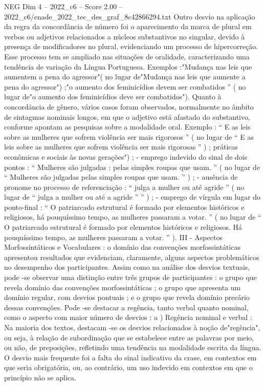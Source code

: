 \begin{textsample}{NEG Dim 4 – 2022\_c6 – Score 2.00 – 2022\_c6/enade\_2022\_tec\_des\_graf\_8c42866294.txt}
Outro desvio na aplicação da regra da concordância de número foi o aparecimento da marca de plural em verbos ou adjetivos relacionados a núcleos substantivos no singular, devido à presença de modificadores no plural, evidenciando um processo de hipercorreção.
Esse processo tem se ampliado nas situações de oralidade, caracterizando uma tendência de variação da Língua Portuguesa.
Exemplos :"Mudança nas leis que aumentem a pena do agressor"( no lugar de"Mudança nas leis que aumente a pena do agressor") ;"o aumento dos feminicídios devem ser combatidos ” ( no lugar de"o aumento dos feminicídios deve ser combatidos").
Quanto à concordância de gênero, vários casos foram observados, normalmente no âmbito de sintagmas nominais longos, em que o adjetivo está afastado do substantivo, conforme apontam as pesquisas sobre a modalidade oral.
Exemplo : “ E as leis sobre as mulheres que sofrem violência ser mais rigorosos ” ( no lugar de “ E as leis sobre as mulheres que sofrem violência ser mais rigorosas ” ) ; práticas econômicas e sociais às novas gerações") ; - emprego indevido do sinal de dois pontos : “ Mulheres são julgadas : pelas simples roupas que usam. ” ( no lugar de “ Mulheres são julgadas pelas simples roupas que usam. ” ) ; - ausência de pronome no processo de referenciação : “ julga a mulher ou até agride ” ( no lugar de “ julga a mulher ou até a agride ” ” ) ; - emprego de vírgula em lugar do ponto-final : “ O patriarcado estrutural é formado por elementos históricos e religiosos, há pouquíssimo tempo, as mulheres passaram a votar. ” ( no lugar de “ O patriarcado estrutural é formado por elementos históricos e religiosos.
Há pouquíssimo tempo, as mulheres passaram a votar. ” ).
III - Aspectos Morfossintáticos e Vocabulares : o domínio das convenções morfossintáticas apresentou resultados que evidenciam, claramente, alguns aspectos problemáticos no desempenho dos participantes.
Assim como na análise dos desvios textuais, pode -se observar uma distinção entre três grupos de participantes : o grupo que revela domínio das convenções morfossintáticas ; o grupo que apresenta um domínio regular, com desvios pontuais ; e o grupo que revela domínio precário dessas convenções.
Pode -se destacar a regência, tanto verbal quanto nominal, como o aspecto com maior número de desvios : a ) Regência nominal e verbal : Na maioria dos textos, destacam -se os desvios relacionados à noção de"regência", ou seja, à relação de subordinação que se estabelece entre as palavras por meio, ou não, de preposições, refletindo uma tendência na modalidade escrita da língua.
O desvio mais frequente foi a falta do sinal indicativo da crase, em contextos em que seria obrigatória, ou, ao contrário, um uso indevido em contextos em que o princípio não se aplica.

\end{textsample}
